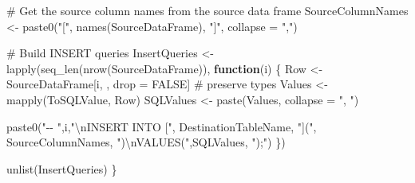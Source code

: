 \documentclass[
  letterpaper,
  DIV=11,
  numbers=noendperiod]{scrreprt}
\newenvironment{Shaded}{\begin{snugshade}}{\end{snugshade}}
\newcommand{\AttributeTok}[1]{\textcolor[rgb]{0.40,0.45,0.13}{#1}}
\newcommand{\CommentTok}[1]{\textcolor[rgb]{0.37,0.37,0.37}{#1}}
\newcommand{\ConstantTok}[1]{\textcolor[rgb]{0.56,0.35,0.01}{#1}}
\newcommand{\ControlFlowTok}[1]{\textcolor[rgb]{0.00,0.23,0.31}{\textbf{#1}}}
\newcommand{\FunctionTok}[1]{\textcolor[rgb]{0.28,0.35,0.67}{#1}}
\newcommand{\NormalTok}[1]{\textcolor[rgb]{0.00,0.23,0.31}{#1}}
\newcommand{\OtherTok}[1]{\textcolor[rgb]{0.00,0.23,0.31}{#1}}
\newcommand{\SpecialCharTok}[1]{\textcolor[rgb]{0.37,0.37,0.37}{#1}}
\newcommand{\StringTok}[1]{\textcolor[rgb]{0.13,0.47,0.30}{#1}}
\begin{document}
\begin{Shaded}
\begin{Highlighting}[]
  \CommentTok{\# Get the source column names from the source data frame}
\NormalTok{  SourceColumnNames }\OtherTok{\textless{}{-}} \FunctionTok{paste0}\NormalTok{(}\StringTok{"["}\NormalTok{, }\FunctionTok{names}\NormalTok{(SourceDataFrame), }\StringTok{"]"}\NormalTok{, }\AttributeTok{collapse =} \StringTok{","}\NormalTok{)}
  
  \CommentTok{\# Build INSERT queries}
\NormalTok{  InsertQueries }\OtherTok{\textless{}{-}} \FunctionTok{lapply}\NormalTok{(}\FunctionTok{seq\_len}\NormalTok{(}\FunctionTok{nrow}\NormalTok{(SourceDataFrame)), }\ControlFlowTok{function}\NormalTok{(i) \{}
\NormalTok{    Row }\OtherTok{\textless{}{-}}\NormalTok{ SourceDataFrame[i, , drop }\OtherTok{=} \ConstantTok{FALSE}\NormalTok{]   }\CommentTok{\# preserve types}
\NormalTok{    Values }\OtherTok{\textless{}{-}} \FunctionTok{mapply}\NormalTok{(ToSQLValue, Row)}
\NormalTok{    SQLValues }\OtherTok{\textless{}{-}} \FunctionTok{paste}\NormalTok{(Values, }\AttributeTok{collapse =} \StringTok{", "}\NormalTok{)}
    
    \FunctionTok{paste0}\NormalTok{(}\StringTok{"{-}{-} "}\NormalTok{,i,}\StringTok{"}\SpecialCharTok{\textbackslash{}n}\StringTok{INSERT INTO ["}\NormalTok{, DestinationTableName, }\StringTok{"]("}\NormalTok{, SourceColumnNames, }\StringTok{")}\SpecialCharTok{\textbackslash{}n}\StringTok{VALUES("}\NormalTok{,SQLValues, }\StringTok{");"}\NormalTok{)}
\NormalTok{  \})}
  
  \FunctionTok{unlist}\NormalTok{(InsertQueries)}
\NormalTok{\}}



\end{Highlighting}
\end{Shaded}
\end{document}
